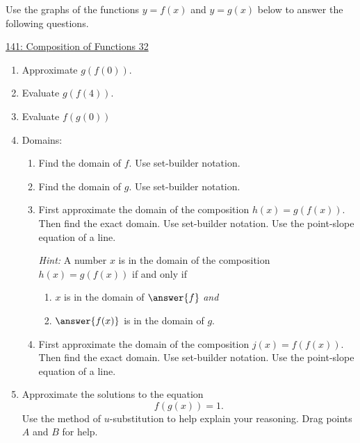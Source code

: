 \documentclass{ximera}
\begin{document}
\begin{example} \label{EXldf3r9BBB}

Use the graphs of the functions $y=f(x)$ and $y=g(x)$ below to answer the following questions.

\begin{onlineOnly}
    \begin{center}
\end{center}
\end{onlineOnly}

\href{https://www.desmos.com/calculator/af873phnsr}{141: Composition of Functions 32}


\begin{enumerate}
\item Approximate $g(f(0))$. 

\item Evaluate $g(f(4))$.

\item Evaluate $f(g(0))$

\item Domains:

\begin{enumerate}
\item Find the domain of $f$. Use set-builder notation. 

\item Find the domain of $g$. Use set-builder notation.

\item First approximate the domain of the composition $h(x) = g(f(x))$. Then find the exact domain. Use set-builder notation. Use the point-slope equation of a line.

\emph{Hint:} A number $x$ is in the domain of the composition $h(x) = g(f(x))$ if and only if
\begin{enumerate}
  \item $x$ is in the domain of $\answer{f}$ \emph{and}
  \item $\answer{f(x)}$ is in the domain of $g$.
\end{enumerate}

\item First approximate the domain of the composition $j(x)=f(f(x))$. Then find the exact domain. Use set-builder notation. Use the point-slope equation of a line.

\end{enumerate}

\item Approximate the solutions to the equation
\[
       f(g(x)) = 1.
\]
Use the method of $u$-substitution to help explain your reasoning. Drag points $A$ and $B$ for help.


\end{enumerate}
\end{example}
\end{document}
